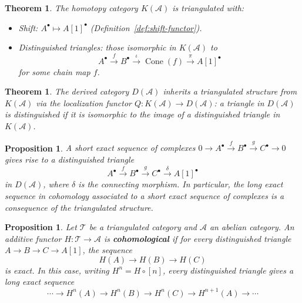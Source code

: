 \documentclass[a4paper,12pt]{book}
\theoremstyle{definition}
\theoremstyle{plain}
\newtheorem{theorem}[definition]{Theorem}
\newtheorem{proposition}[definition]{Proposition}
\theoremstyle{remark}
\begin{document}
\begin{theorem}\label{thm:K-A-triangulated}
The homotopy category $K(\mathcal{A})$ is triangulated with:
\begin{itemize}
    \item Shift: $A^\bullet \mapsto A[1]^\bullet$ (Definition~\ref{def:shift-functor}).
    \item Distinguished triangles: those isomorphic in $K(\mathcal{A})$ to
    \[
        A^\bullet \xrightarrow{f} B^\bullet \xrightarrow{\iota} \operatorname{Cone}(f)
        \xrightarrow{\pi} A[1]^\bullet
    \]
    for some chain map $f$.
\end{itemize}
\end{theorem}

\begin{theorem}\label{thm:D-A-triangulated}
The derived category $D(\mathcal{A})$ inherits a triangulated structure from $K(\mathcal{A})$
via the localization functor $Q \colon K(\mathcal{A}) \to D(\mathcal{A})$: a triangle in
$D(\mathcal{A})$ is distinguished if it is isomorphic to the image of a distinguished
triangle in $K(\mathcal{A})$.
\end{theorem}

\begin{proposition}\label{prop:ses-to-triangle}
A short exact sequence of complexes $0 \to A^\bullet \xrightarrow{f} B^\bullet
\xrightarrow{g} C^\bullet \to 0$ gives rise to a distinguished triangle
\[
    A^\bullet \xrightarrow{f} B^\bullet \xrightarrow{g} C^\bullet
    \xrightarrow{\delta} A[1]^\bullet
\]
in $D(\mathcal{A})$, where $\delta$ is the connecting morphism. In particular, the
long exact sequence in cohomology associated to a short exact sequence of complexes
is a consequence of the triangulated structure.
\end{proposition}

\begin{proposition}\label{prop:cohomological-functor}
Let $\mathcal{T}$ be a triangulated category and $\mathcal{A}$ an abelian category.
An additive functor $H \colon \mathcal{T} \to \mathcal{A}$ is \textbf{cohomological} if
for every distinguished triangle $A \to B \to C \to A[1]$, the sequence
\[
    H(A) \longrightarrow H(B) \longrightarrow H(C)
\]
is exact. In this case, writing $H^n = H \circ [n]$, every distinguished triangle
gives a long exact sequence
\[
    \cdots \to H^n(A) \to H^n(B) \to H^n(C) \to H^{n+1}(A) \to \cdots
\]
\end{proposition}
\end{document}
